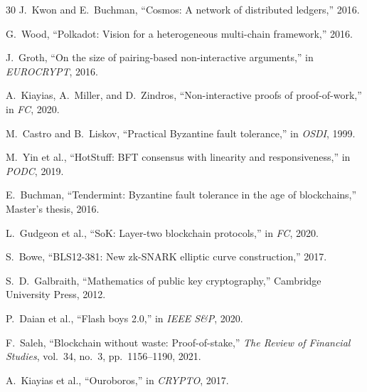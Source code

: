 \documentclass[11pt,a4paper]{article}
\begin{document}
\begin{thebibliography}{30}
J.~Kwon and E.~Buchman, ``Cosmos: A network of distributed ledgers,'' 2016.

G.~Wood, ``Polkadot: Vision for a heterogeneous multi-chain framework,'' 2016.

J.~Groth, ``On the size of pairing-based non-interactive arguments,'' in \emph{EUROCRYPT}, 2016.

A.~Kiayias, A.~Miller, and D.~Zindros, ``Non-interactive proofs of proof-of-work,'' in \emph{FC}, 2020.

M.~Castro and B.~Liskov, ``Practical Byzantine fault tolerance,'' in \emph{OSDI}, 1999.

M.~Yin et al., ``HotStuff: BFT consensus with linearity and responsiveness,'' in \emph{PODC}, 2019.

E.~Buchman, ``Tendermint: Byzantine fault tolerance in the age of blockchains,'' Master's thesis, 2016.

L.~Gudgeon et al., ``SoK: Layer-two blockchain protocols,'' in \emph{FC}, 2020.

S.~Bowe, ``BLS12-381: New zk-SNARK elliptic curve construction,'' 2017.

S.~D.~Galbraith, ``Mathematics of public key cryptography,'' Cambridge University Press, 2012.

P.~Daian et al., ``Flash boys 2.0,'' in \emph{IEEE S\&P}, 2020.

F.~Saleh, ``Blockchain without waste: Proof-of-stake,'' \emph{The Review of Financial Studies}, vol.~34, no.~3, pp.~1156--1190, 2021.

A.~Kiayias et al., ``Ouroboros,'' in \emph{CRYPTO}, 2017.

\end{thebibliography}
\end{document}

